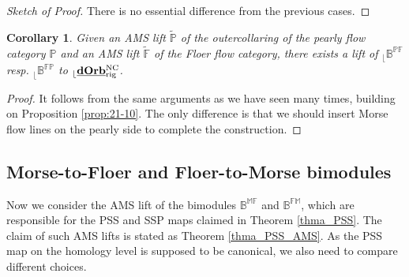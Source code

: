 \documentclass[reqno, 10pt]{amsart}
\numberwithin{equation}{section}
\numberwithin{equation}{section}
\newtheorem{cor}[thm]{Corollary}
\theoremstyle{definition}
\theoremstyle{remark}
\newcommand{\mb}{\mathbb}
\renewcommand{\outer}{{}_{\lfloor}}
\newcommand{\uds}[1]{\underline{\smash{#1}}}
\begin{document}
\begin{proof}[Sketch of Proof] There is no essential difference from the previous cases. 
\end{proof}



\begin{cor}
Given an AMS lift $\tilde{\mb P}$ of the outercollaring of the pearly flow category $\mb{P}$ and an AMS lift $\tilde{\mb F}$ of the Floer flow category, there exists a lift of $\outer \mb{B}^{\mb{PF}}$ resp. $\outer \mb{B}^{\mb{FP}}$ to $\outer \uds{\bf dOrb}_{\rm rig}^{\rm NC}$. 
\end{cor}

\begin{proof}
It follows from the same arguments as we have seen many times, building on Proposition \ref{prop:21-10}. The only difference is that we should insert Morse flow lines on the pearly side to complete the construction.
\end{proof}

\subsection{Morse-to-Floer and Floer-to-Morse bimodules}\label{subsection_Morse_Floer}


Now we consider the AMS lift of the bimodules $\mb{B}^{\mb{MF}}$ and $\mb{B}^{\mb{FM}}$, which are responsible for the PSS and SSP maps claimed in Theorem \ref{thma_PSS}. The claim of such AMS lifts is stated as Theorem \ref{thma_PSS_AMS}. As the PSS map on the homology level is supposed to be canonical, we also need to compare different choices. 
\end{document}
